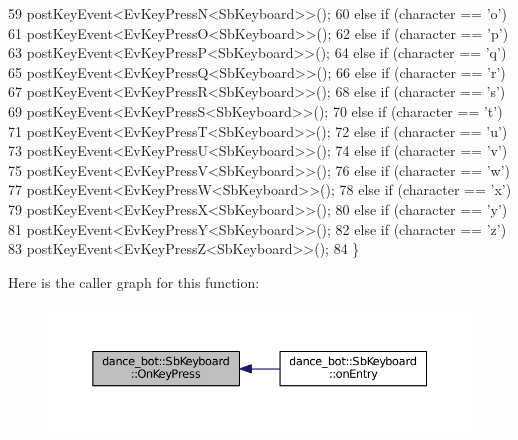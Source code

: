 \begin{DoxyCode}
59                         postKeyEvent<EvKeyPressN<SbKeyboard>>();
60                 \textcolor{keywordflow}{else} \textcolor{keywordflow}{if} (character == \textcolor{charliteral}{'o'})
61                         postKeyEvent<EvKeyPressO<SbKeyboard>>();
62                 \textcolor{keywordflow}{else} \textcolor{keywordflow}{if} (character == \textcolor{charliteral}{'p'})
63                         postKeyEvent<EvKeyPressP<SbKeyboard>>();
64                 \textcolor{keywordflow}{else} \textcolor{keywordflow}{if} (character == \textcolor{charliteral}{'q'})
65                         postKeyEvent<EvKeyPressQ<SbKeyboard>>();
66                 \textcolor{keywordflow}{else} \textcolor{keywordflow}{if} (character == \textcolor{charliteral}{'r'})
67                         postKeyEvent<EvKeyPressR<SbKeyboard>>();
68                 \textcolor{keywordflow}{else} \textcolor{keywordflow}{if} (character == \textcolor{charliteral}{'s'})
69                         postKeyEvent<EvKeyPressS<SbKeyboard>>();
70                 \textcolor{keywordflow}{else} \textcolor{keywordflow}{if} (character == \textcolor{charliteral}{'t'})
71                         postKeyEvent<EvKeyPressT<SbKeyboard>>();
72                 \textcolor{keywordflow}{else} \textcolor{keywordflow}{if} (character == \textcolor{charliteral}{'u'})
73                         postKeyEvent<EvKeyPressU<SbKeyboard>>();
74                 \textcolor{keywordflow}{else} \textcolor{keywordflow}{if} (character == \textcolor{charliteral}{'v'})
75                         postKeyEvent<EvKeyPressV<SbKeyboard>>();
76                 \textcolor{keywordflow}{else} \textcolor{keywordflow}{if} (character == \textcolor{charliteral}{'w'})
77                         postKeyEvent<EvKeyPressW<SbKeyboard>>();
78                 \textcolor{keywordflow}{else} \textcolor{keywordflow}{if} (character == \textcolor{charliteral}{'x'})
79                         postKeyEvent<EvKeyPressX<SbKeyboard>>();
80                 \textcolor{keywordflow}{else} \textcolor{keywordflow}{if} (character == \textcolor{charliteral}{'y'})
81                         postKeyEvent<EvKeyPressY<SbKeyboard>>();
82                 \textcolor{keywordflow}{else} \textcolor{keywordflow}{if} (character == \textcolor{charliteral}{'z'})
83                         postKeyEvent<EvKeyPressZ<SbKeyboard>>();
84         \}
\end{DoxyCode}


Here is the caller graph for this function\+:
\nopagebreak
\begin{figure}[H]
\begin{center}
\leavevmode
\includegraphics[width=350pt]{classdance__bot_1_1SbKeyboard_a802021e4deeb726b7c05111a1d9fa0b4_icgraph}
\end{center}
\end{figure}


